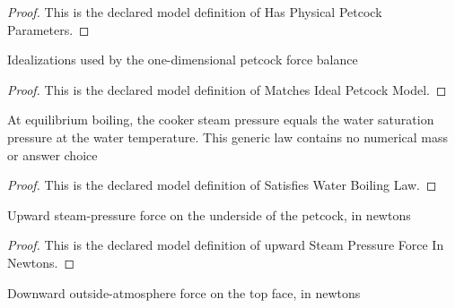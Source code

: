 \begin{proof}
  This is the declared model definition of Has Physical Petcock Parameters.
\end{proof}
\begin{definition}
  \label{def:physics:phyx-mini-0398:phyxminiproblems-problemphyxmini0398-matchesidealpetcockmodel}
  Idealizations used by the one-dimensional petcock force balance
\end{definition}
\begin{proof}
  This is the declared model definition of Matches Ideal Petcock Model.
\end{proof}
\begin{definition}
  \label{def:physics:phyx-mini-0398:phyxminiproblems-problemphyxmini0398-satisfieswaterboilinglaw}
  At equilibrium boiling, the cooker steam pressure equals the water saturation pressure at the water temperature. This generic law contains no numerical mass or answer choice
\end{definition}
\begin{proof}
  This is the declared model definition of Satisfies Water Boiling Law.
\end{proof}
\begin{definition}
  \label{def:physics:phyx-mini-0398:phyxminiproblems-problemphyxmini0398-upwardsteampressureforceinnewtons}
  Upward steam-pressure force on the underside of the petcock, in newtons
\end{definition}
\begin{proof}
  This is the declared model definition of upward Steam Pressure Force In Newtons.
\end{proof}
\begin{definition}
  \label{def:physics:phyx-mini-0398:phyxminiproblems-problemphyxmini0398-downwardatmosphericforceinnewtons}
  Downward outside-atmosphere force on the top face, in newtons
\end{definition}
